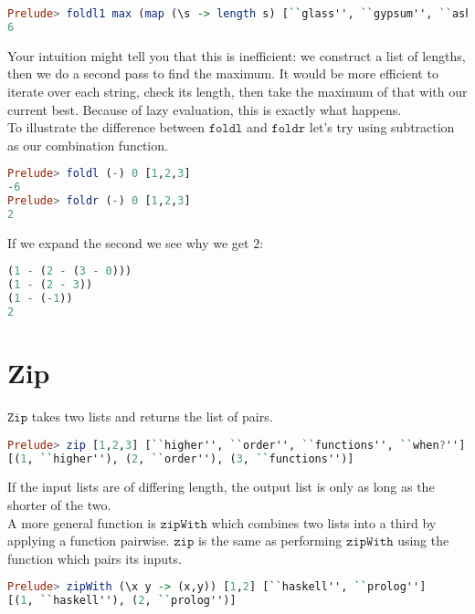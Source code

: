 \documentclass[a4paper,12pt]{article}
\newcommand{\kwa}[1]{\mathtt{#1}}
\begin{document}
\begin{lstlisting}[language=Haskell]
Prelude> foldl1 max (map (\s -> length s) [``glass'', ``gypsum'', ``ash''])
6
\end{lstlisting}

\noindent
Your intuition might tell you that this is inefficient: we construct a list of lengths, then we do a second pass to find the maximum. It would be more efficient to iterate over each string, check its length, then take the maximum of that with our current best. Because of lazy evaluation, this is exactly what happens. \\

\noindent
To illustrate the difference between $\kwa{foldl}$ and $\kwa{foldr}$ let's try using subtraction as our combination function.

\begin{lstlisting}[language=Haskell]
Prelude> foldl (-) 0 [1,2,3]
-6
Prelude> foldr (-) 0 [1,2,3]
2
\end{lstlisting}

\noindent
If we expand the second we see why we get $2$:

\begin{lstlisting}[language=Haskell]
(1 - (2 - (3 - 0)))
(1 - (2 - 3))
(1 - (-1))
2
\end{lstlisting}

\section{Zip}

\noindent
$\kwa{Zip}$ takes two lists and returns the list of pairs.

\begin{lstlisting}[language=Haskell]
Prelude> zip [1,2,3] [``higher'', ``order'', ``functions'', ``when?'']
[(1, ``higher''), (2, ``order''), (3, ``functions'')]
\end{lstlisting}

\noindent
If the  input lists are of differing length, the output list is only as long as the shorter of the two. \\

\noindent
A more general function is $\kwa{zipWith}$ which combines two lists into a third by applying a function pairwise. $\kwa{zip}$ is the same as performing $\kwa{zipWith}$ using the function which pairs its inputs.

\begin{lstlisting}[language=Haskell]
Prelude> zipWith (\x y -> (x,y)) [1,2] [``haskell'', ``prolog'']
[(1, ``haskell''), (2, ``prolog'')]
\end{lstlisting}
\end{document}
